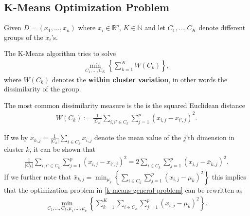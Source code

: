 \documentclass[aspectratio=169,10pt]{beamer}
\begin{document}
\subsection{K-Means Optimization Problem}
\begin{frame}{\secname}{\subsecname}
  Given $D = (x_1, \ldots, x_n)$ where $x_i \in \mathbb{R}^p$, $K \in \mathbb{N}$ and let $C_1, \ldots, C_K$ denote different groups of the $x_i$'s.
  
  The K-Means algorithm tries to solve
  \begin{align}
    \min_{C_1, \ldots, C_K} \left\{\sum_{k=1}^K W(C_k)\right\}, \label{k-means-general-problem}
  \end{align}
  where $W(C_k)$ denotes the \textbf{within cluster variation}, in other words the dissimilarity of the group.
  
  {\small The most common dissimilarity measure is the is the squared Euclidean distance
  \begin{align}
    W(C_k) := \frac{1}{|C_k|} \sum_{i,i' \in C_k} \sum_{j = 1}^p (x_{i,j} - x_{i',j})^2.
  \end{align}}
\end{frame}

\begin{frame}{\secname}{\subsecname}
  If we by $\bar{x}_{k,j} = \frac{1}{|C_k|}\sum_{i \in C_k} x_{i,j}$ denote the mean value of the $j$'th dimension in cluster $k$, it can be shown that
  \begin{align}
    \frac{1}{|C_k|} \sum_{i,i' \in C_k} \sum_{j = 1}^p (x_{i,j} - x_{i',j})^2 = 2 \sum_{i \in C_k} \sum_{j = 1}^p (x_{i,j} - \bar{x}_{k,j})^2.
  \end{align}
  If we further note that $\bar{x}_{k,j} = \min_{\mu_k} \left\{ \sum_{i \in C_k} \sum_{j = 1}^p (x_{i,j} - \mu_k)^2\right\}$ this implies that the optimization problem in \eqref{k-means-general-problem} can be rewritten as
  \begin{align}
    \min_{C_1, \ldots, C_k, \mu_1, \ldots, \mu_k} \left\{ \sum_{k = 1}^K \sum_{i \in C_k} \sum_{j = 1}^p (x_{i,j} - \mu_k)^2 \right\}.
  \end{align}
\end{frame}
\end{document}
